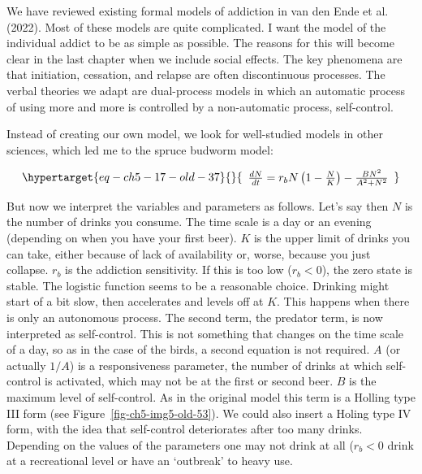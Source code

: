 \documentclass[
  letterpaper,
]{scrbook}
\begin{document}
We have reviewed existing formal models of addiction in van den Ende et
al. (2022). Most of these models are quite complicated. I want the model
of the individual addict to be as simple as possible. The reasons for
this will become clear in the last chapter when we include social
effects. The key phenomena are that initiation, cessation, and relapse
are often discontinuous processes. The verbal theories we adapt are
dual-process models in which an automatic process of using more and more
is controlled by a non-automatic process, self-control.

Instead of creating our own model, we look for well-studied models in
other sciences, which led me to the spruce budworm model:

\begin{equation}\protect\hypertarget{eq-ch5-17-old-37}{}{\begin{array}{r}
\frac{dN}{dt} = r_{b}N\left( 1 - \frac{N}{K} \right) - \frac{BN^{2}}{A^{2} + N^{2}}
\end{array}}\label{eq-ch5-17-old-37}\end{equation}

But now we interpret the variables and parameters as follows. Let's say
then \(N\) is the number of drinks you consume. The time scale is a day
or an evening (depending on when you have your first beer). \(K\) is the
upper limit of drinks you can take, either because of lack of
availability or, worse, because you just collapse. \(r_{b}\) is the
addiction sensitivity. If this is too low (\(r_{b} < 0\)), the zero
state is stable. The logistic function seems to be a reasonable choice.
Drinking might start of a bit slow, then accelerates and levels off at
\(K\). This happens when there is only an autonomous process. The second
term, the predator term, is now interpreted as self-control. This is not
something that changes on the time scale of a day, so as in the case of
the birds, a second equation is not required. \(A\) (or actually
\(1/A\)) is a responsiveness parameter, the number of drinks at which
self-control is activated, which may not be at the first or second beer.
\(B\) is the maximum level of self-control. As in the original model
this term is a Holling type III form (see
Figure~\ref{fig-ch5-img5-old-53}). We could also insert a Holing type IV
form, with the idea that self-control deteriorates after too many
drinks. Depending on the values of the parameters one may not drink at
all (\(r_{b} < 0\) drink at a recreational level or have an `outbreak'
to heavy use.
\end{document}
